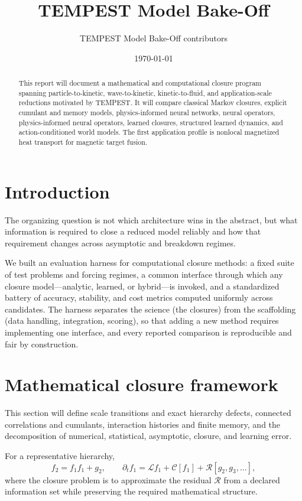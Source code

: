 \documentclass[11pt]{article}
\title{TEMPEST Model Bake-Off}
\author{TEMPEST Model Bake-Off contributors}
\date{\today}
\begin{document}
\maketitle

\begin{abstract}
This report will document a mathematical and computational closure program
spanning particle-to-kinetic, wave-to-kinetic, kinetic-to-fluid, and
application-scale reductions motivated by TEMPEST.  It will compare classical
Markov closures, explicit cumulant and memory models, physics-informed neural
networks, neural operators, physics-informed neural operators, learned
closures, structured learned dynamics, and action-conditioned world models.
The first application profile is nonlocal magnetized heat transport for
magnetic target fusion.
\end{abstract}

\setcounter{tocdepth}{1}
\tableofcontents

\section{Introduction}
The organizing question is not which architecture wins in the abstract, but
what information is required to close a reduced model reliably and how that
requirement changes across asymptotic and breakdown regimes.

We built an evaluation harness for computational closure methods: a fixed
suite of test problems and forcing regimes, a common interface through which
any closure model---analytic, learned, or hybrid---is invoked, and a
standardized battery of accuracy, stability, and cost metrics computed
uniformly across candidates. The harness separates the science (the closures)
from the scaffolding (data handling, integration, scoring), so that adding a
new method requires implementing one interface, and every reported comparison
is reproducible and fair by construction.

\section{Mathematical closure framework}
This section will define scale transitions and exact hierarchy defects,
connected correlations and cumulants, interaction histories and finite memory,
and the decomposition of numerical, statistical, asymptotic, closure, and
learning error.

For a representative hierarchy,
\begin{equation}
  f_2=f_1f_1+g_2,
  \qquad
  \partial_t f_1=\mathcal L f_1+\mathcal C[f_1]
  +\mathcal R[g_2,g_3,\ldots],
\end{equation}
where the closure problem is to approximate the residual $\mathcal R$ from a
declared information set while preserving the required mathematical structure.
\end{document}
